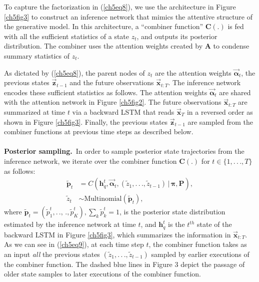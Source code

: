 \documentclass [PhD] {uclathes}
\begin{document}
To capture the factorization in (\ref{ch5eq8}), we use the architecture in Figure \ref{ch5fig3} to construct an inference network that mimics the attentive structure of the generative model. In this architecture, a ``combiner function'' $\boldsymbol{C}(.)$ is fed with all the sufficient statistics of a state $z_t$, and outputs its posterior distribution. The combiner uses the attention weights created by $\boldsymbol{A}$ to condense summary statistics of $z_t$.  

As dictated by (\ref{ch5eq8}), the parent nodes of $z_t$ are the attention weights $\boldsymbol{\vec{\alpha}}_{t}$, the previous states $\boldsymbol{\vec{z}}_{t-1}$ and the future observations $\boldsymbol{\vec{x}}_{t:T}$. The inference network encodes these sufficient statistics as follows. The attention weights $\boldsymbol{\vec{\alpha}}_{t}$ are shared with the attention network in Figure \ref{ch5fig2}. The future observations $\boldsymbol{\vec{x}}_{t:T}$ are summarized at time $t$ via a backward LSTM that reads $\boldsymbol{\vec{x}}_{T}$ in a reversed order as shown in Figure \ref{ch5fig3}. Finally, the previous states $\boldsymbol{\vec{z}}_{t-1}$ are sampled from the combiner functions at previous time steps as described below.\\ 
\\
{\bf Posterior sampling.}\, In order to sample posterior state trajectories from the inference network, we iterate over the combiner function $\boldsymbol{C}(.)$ for $t \in \{1,.\,.\,.,T\}$ as follows:
\begin{align}
\boldsymbol{\tilde{p}}_t &= C(\boldsymbol{h}^t_q,\boldsymbol{\vec{\alpha}}_{t},(\tilde{z}_1,.\,.\,.,\tilde{z}_{t-1})\,|\,\boldsymbol{\pi},\boldsymbol{P}),\nonumber\\
\tilde{z}_t        &\sim \mbox{Multinomial}(\boldsymbol{\tilde{p}}_t),
\label{ch5eq9}
\end{align}
where $\boldsymbol{\tilde{p}}_t = (\tilde{p}^t_1,.\,.,\,.,\tilde{p}^t_K), \sum_k \tilde{p}^t_k =1$, is the posterior state distribution estimated by the inference network at time $t$, and $\boldsymbol{h}^t_q$ is the $t^{th}$ state of the backward LSTM in Figure \ref{ch5fig3}, which summarizes the information in $\boldsymbol{\vec{x}}_{t:T}$. As we can see in (\ref{ch5eq9}), at each time step $t$, the combiner function takes as an input {\it all} the previous states $(\tilde{z}_1,.\,.\,.,\tilde{z}_{t-1})$ sampled by earlier executions of the combiner function. The dashed blue lines in Figure 3 depict the passage of older state samples to later executions of the combiner function. 
\end{document}
